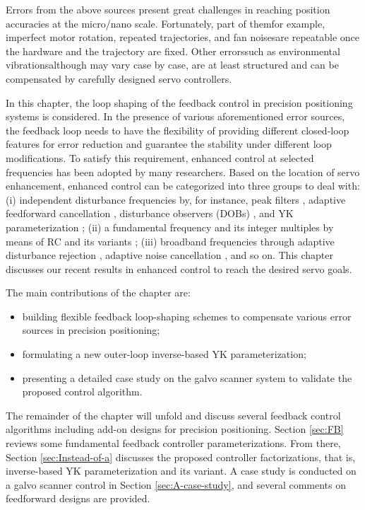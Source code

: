 \documentclass [11pt, proquest] {uwthesis}[2020/02/24]
\begin{document}
Errors from the above sources present great challenges in reaching
position accuracies at the micro/nano scale. Fortunately, part of
them\textemdash for example, imperfect motor rotation, repeated trajectories,
and fan noises\textemdash are repeatable once the hardware and the
trajectory are fixed. Other errors\textemdash such as environmental
vibrations\textemdash although may vary case by case, are at least
structured and can be compensated by carefully designed servo controllers. 

In this chapter, the loop shaping of the feedback control in precision
positioning systems is considered. In the presence of various aforementioned
error sources, the feedback loop needs to have the flexibility of
providing different closed-loop features for error reduction and guarantee
the stability under different loop modifications. To satisfy this
requirement, enhanced control at selected frequencies has been adopted
by many researchers. Based on the location of servo enhancement, enhanced
control can be categorized into three groups to deal with: (i) independent
disturbance frequencies by, for instance, peak filters \cite{li2011reset,sievers1992comparison},
adaptive feedforward cancellation \cite{Bodson1997,chen2016multirate},
disturbance observers (DOBs) \cite{XuChen_TCST2012,zheng2017design,chen2013selective},
and YK parameterization \cite{landau2005adaptive,landau2013benchmark,youla1976modern,kucera1975stability};
(ii) a fundamental frequency and its integer multiples by means of
RC and its variants \cite{chen2014new,steinbuch2007design};
(iii) broadband frequencies through adaptive disturbance rejection
\cite{de2013adaptive}, adaptive noise cancellation \cite{widrow1975adaptive},
and so on. This chapter discusses our recent results in enhanced control
to reach the desired servo goals. 

The main contributions of the chapter are:
\begin{itemize}
\item building flexible feedback loop-shaping schemes to compensate various
error sources in precision positioning;
\item formulating a new outer-loop inverse-based YK parameterization;
\item presenting a detailed case study on the galvo scanner system to validate
the proposed control algorithm.
\end{itemize}
The remainder of the chapter will unfold and discuss several feedback
control algorithms including add-on designs for precision positioning.
Section \ref{sec:FB} reviews some fundamental feedback controller
parameterizations. From there, Section \ref{sec:Instead-of-a} discusses
the proposed controller factorizations, that is, inverse-based YK
parameterization and its variant. A case study is conducted on a galvo
scanner control in Section \ref{sec:A-case-study}, and several comments
on feedforward designs are provided.
\end{document}
